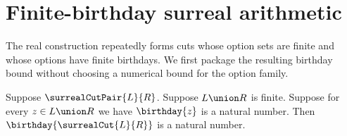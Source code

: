 



\section{Finite-birthday surreal arithmetic}

The real construction repeatedly forms cuts whose option sets are finite and
whose options have finite birthdays.  We first package the resulting birthday
bound without choosing a numerical bound for the option family.

\begin{theorem}\label{finite_surreal_cut_birthday}
    Suppose $\surrealCutPair{L}{R}$.
    Suppose $L\union R$ is finite.
    Suppose for every $z\in L\union R$ we have $\birthday{z}$ is a
        natural number.
    Then $\birthday{\surrealCut{L}{R}}$ is a natural number.
\end{theorem}
